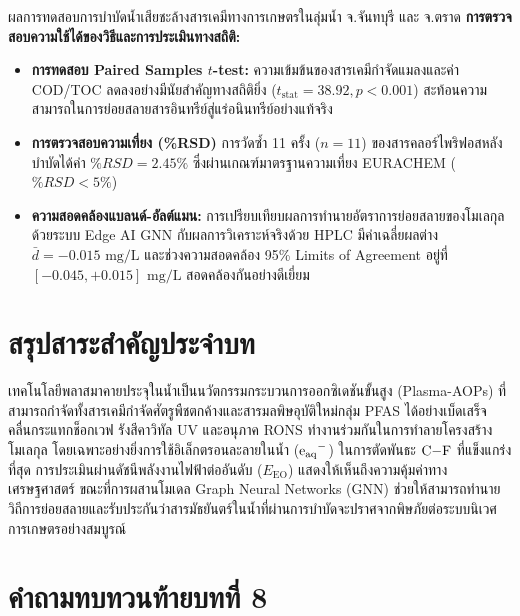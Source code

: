 \begin{agribox}{ผลการทดสอบการบำบัดน้ำเสียชะล้างสารเคมีทางการเกษตรในลุ่มน้ำ จ.จันทบุรี และ จ.ตราด}
\textbf{การตรวจสอบความใช้ได้ของวิธีและการประเมินทางสถิติ:}
\begin{itemize}
    \item \textbf{การทดสอบ Paired Samples $t$-test:} ความเข้มข้นของสารเคมีกำจัดแมลงและค่า COD/TOC ลดลงอย่างมีนัยสำคัญทางสถิติยิ่ง ($t_{\text{stat}} = 38.92, p < 0.001$) สะท้อนความสามารถในการย่อยสลายสารอินทรีย์สู่แร่อนินทรีย์อย่างแท้จริง
    \item \textbf{การตรวจสอบความเที่ยง (\%RSD)} การวัดซ้ำ 11 ครั้ง ($n = 11$) ของสารคลอร์ไพริฟอสหลังบำบัดได้ค่า $\%RSD = 2.45\%$ ซึ่งผ่านเกณฑ์มาตรฐานความเที่ยง EURACHEM ($\%RSD < 5\%$)
    \item \textbf{ความสอดคล้องแบลนด์-อัลต์แมน:} การเปรียบเทียบผลการทำนายอัตราการย่อยสลายของโมเลกุลด้วยระบบ Edge AI GNN กับผลการวิเคราะห์จริงด้วย HPLC มีค่าเฉลี่ยผลต่าง $\bar{d} = -0.015 \text{ mg/L}$ และช่วงความสอดคล้อง 95\% Limits of Agreement อยู่ที่ $[-0.045, +0.015] \text{ mg/L}$ สอดคล้องกันอย่างดีเยี่ยม
\end{itemize}
\end{agribox}

\section{สรุปสาระสำคัญประจำบท}

เทคโนโลยีพลาสมาคายประจุในน้ำเป็นนวัตกรรมกระบวนการออกซิเดชันขั้นสูง (Plasma-AOPs) ที่สามารถกำจัดทั้งสารเคมีกำจัดศัตรูพืชตกค้างและสารมลพิษอุบัติใหม่กลุ่ม PFAS ได้อย่างเบ็ดเสร็จ คลื่นกระแทกช็อกเวฟ รังสีคาวิทัล UV และอนุภาค RONS ทำงานร่วมกันในการทำลายโครงสร้างโมเลกุล โดยเฉพาะอย่างยิ่งการใช้อิเล็กตรอนละลายในน้ำ ($\ce{e_{aq}^-}$) ในการตัดพันธะ $\ce{C-F}$ ที่แข็งแกร่งที่สุด การประเมินผ่านดัชนีพลังงานไฟฟ้าต่ออันดับ ($E_{\text{EO}}$) แสดงให้เห็นถึงความคุ้มค่าทางเศรษฐศาสตร์ ขณะที่การผสานโมเดล Graph Neural Networks (GNN) ช่วยให้สามารถทำนายวิถีการย่อยสลายและรับประกันว่าสารมัธยันตร์ในน้ำที่ผ่านการบำบัดจะปราศจากพิษภัยต่อระบบนิเวศการเกษตรอย่างสมบูรณ์

\section{คำถามทบทวนท้ายบทที่ 8}

